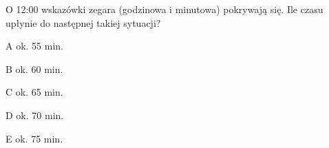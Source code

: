 \begin{tresc}
O 12:00 wskazówki zegara (godzinowa i minutowa) pokrywają się. Ile czasu upłynie do następnej takiej sytuacji?
\end{tresc}
\begin{wariant}{A} ok. 55 min. \end{wariant}
\begin{wariant}{B} ok. 60 min. \end{wariant}
\begin{wariant}{C} ok. 65 min. \end{wariant}
\begin{wariant}{D} ok. 70 min. \end{wariant}
\begin{wariant}{E} ok. 75 min. \end{wariant}
